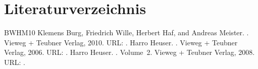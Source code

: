 \documentclass[letterpaper,10pt,english]{jupyterBook}
\begin{document}
\chapter{Literaturverzeichnis}
\label{\detokenize{Appendix:literaturverzeichnis}}\label{\detokenize{Appendix::doc}}


\begin{sphinxthebibliography}{BWHM10}
Klemens Burg, Friedrich Wille, Herbert Haf, and Andreas Meister. . Vieweg + Teubner Verlag, 2010. URL: .
Harro Heuser. . Vieweg + Teubner Verlag, 2006. URL: .
Harro Heuser. . Volume 2. Vieweg + Teubner Verlag, 2008. URL: .
\end{sphinxthebibliography}







\renewcommand{\indexname}{Index}
\printindex
\end{document}
